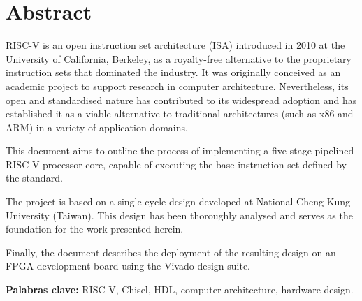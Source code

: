 \chapter*{Abstract}

RISC-V is an open instruction set architecture (ISA) introduced in 2010 at the University of California, Berkeley, as a royalty-free alternative to the proprietary instruction sets that dominated the industry. It was originally conceived as an academic project to support research in computer architecture. Nevertheless, its open and standardised nature has contributed to its widespread adoption and has established it as a viable alternative to traditional architectures (such as x86 and ARM) in a variety of application domains.

This document aims to outline the process of implementing a five-stage pipelined RISC-V processor core, capable of executing the base instruction set defined by the standard.

The project is based on a single-cycle design developed at National Cheng Kung University (Taiwan). This design has been thoroughly analysed and serves as the foundation for the work presented herein.

Finally, the document describes the deployment of the resulting design on an FPGA development board using the Vivado design suite.\newline\newline

\textbf{Palabras clave:} RISC-V, Chisel, HDL, computer architecture, hardware design.